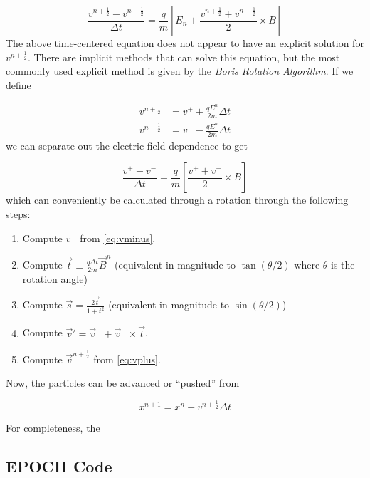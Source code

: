 \begin{equation}
	\frac{v^{n + \frac{1}{2}} - v^{n - \frac{1}{2}}}{\Delta t} = \frac{q}{m}[E_n + \frac{v^{n + \frac{1}{2}} + v^{n + \frac{1}{2}}}{2} \times B]
\end{equation}
The above time-centered equation does not appear to have an explicit solution for $v^{n + \frac{1}{2}}$. There are implicit methods that can solve this equation, but the most commonly used explicit method is given by the \emph{Boris Rotation Algorithm}. If we define 

\begin{align}
	v^{n + \frac{1}{2}} &= v^+ + \frac{q E^n}{2 m} \Delta t \label{eq:vplus} \\
	v^{n - \frac{1}{2}} &= v^- - \frac{q E^n}{2 m} \Delta t \label{eq:vminus}
\end{align}
we can separate out the electric field dependence to get 

\begin{equation}
	\frac{v^+ - v^-}{\Delta t} = \frac{q}{m}[\frac{v^+ + v^-}{2} \times B]
\end{equation}
which can conveniently be calculated through a rotation\cite{Birdsall_2004_PIC} through the following steps:

\begin{enumerate}
	\item Compute $v^-$ from \cref{eq:vminus}.
	\item Compute $\vec{t} \equiv \frac{q \Delta t}{2 m} \vec{B}^n $ (equivalent in magnitude to $\tan(\theta/2)$ where $\theta$ is the rotation angle)
	\item Compute $\vec{s} = \frac{2 \vec{t}}{1 + t^2}$ (equivalent in magnitude to $\sin(\theta/2)$)
	\item Compute $\vec{v}' = \vec{v}^- + \vec{v}^- \times \vec{t}$.
	\item Compute $\vec{v}^{n+\frac{1}{2}}$ from \cref{eq:vplus}.
\end{enumerate}
Now, the particles can be advanced or ``pushed'' from

\begin{equation}
	x^{n+1} = x^{n} + v^{n+\frac{1}{2}} \Delta t \label{eq:particlepush}
\end{equation}

For completeness, the 

\subsection{EPOCH Code}

